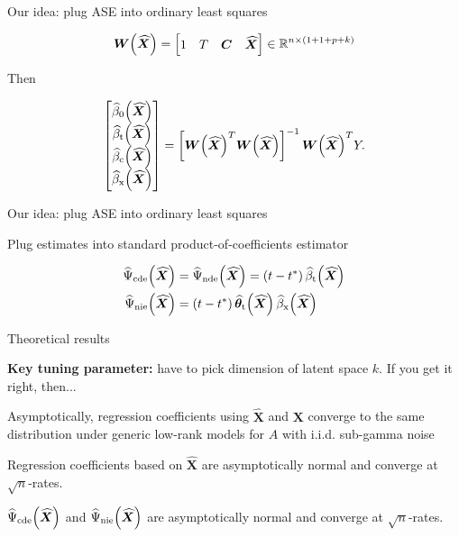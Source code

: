 \documentclass{beamer}
\theoremstyle{remark}
\newcommand{\C}{\bm C}
\newcommand{\X}{\bm X}
\newcommand{\W}{\bm W}
\newcommand{\Xhat}{\widehat{\X}}
\newcommand \R {\mathbb{R}}
\newcommand \thetathat [1] {\widehat{\bm \theta}_\text{t} \paren*{#1}}
\newcommand \betazerohat [1] {\widehat{\beta}_0 \paren*{#1}}
\newcommand \betathat [1] {\widehat{\beta}_\text{t} \paren*{#1}}
\newcommand \betachat [1] {\widehat{\beta}_\text{c} \paren*{#1}}
\newcommand \betaxhat [1] {\widehat{\beta}_\text{x} \paren*{#1}}
\newcommand \cdehat [1] {\widehat{\Psi}_\text{cde} \paren*{#1}}
\newcommand \ndehat [1] {\widehat{\Psi}_\text{nde} \paren*{#1}}
\newcommand \niehat [1] {\widehat{\Psi}_\text{nie} \paren*{#1}}
\DeclarePairedDelimiter{\paren}{(}{)}
\begin{document}
\begin{frame}{Our idea: plug ASE into ordinary least squares}

    \begin{align*}
        \W \paren*{\Xhat} = \begin{bmatrix}
            1 & T & \C & \Xhat \\
        \end{bmatrix} \in \R^{n \times (1 + 1 + p + k)}
    \end{align*}

    Then

    \begin{align*}
        \begin{bmatrix}
            \betazerohat{\Xhat} \\
            \betathat{\Xhat}    \\
            \betachat{\Xhat}    \\
            \betaxhat{\Xhat}
        \end{bmatrix}
        = \left[ \W \paren*{\Xhat}^T  \W \paren*{\Xhat} \right]^{-1} \W \paren*{\Xhat}^T Y.
    \end{align*}
\end{frame}

\begin{frame}{Our idea: plug ASE into ordinary least squares}

    Plug estimates into standard product-of-coefficients estimator

    \begin{align*}
        \cdehat{\Xhat} & = \ndehat{\Xhat} = \paren*{t - t^*} \, \betathat{\Xhat}     \\
        \niehat{\Xhat} & = \paren*{t - t^*} \, \thetathat{\Xhat} \, \betaxhat{\Xhat}
    \end{align*}

\end{frame}

\begin{frame}{Theoretical results}

    \textbf{Key tuning parameter:} have to pick dimension of latent space $k$. If you get it right, then...

    \begin{theorem}[informal]
        Asymptotically, regression coefficients using $\Xhat$ and $\X$ converge to the same distribution under generic low-rank models for $A$ with i.i.d. sub-gamma noise
    \end{theorem}

    \begin{corollary}[informal]
        Regression coefficients based on $\Xhat$ are asymptotically normal and converge at $\sqrt n$-rates.
    \end{corollary}

    \begin{corollary}[informal]
        $\cdehat{\Xhat}$ and $\niehat{\Xhat}$ are asymptotically normal and converge at $\sqrt n$-rates.
    \end{corollary}
\end{frame}
\end{document}
